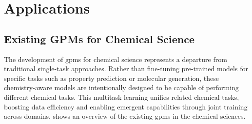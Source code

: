 \section{Applications}



\subsection{Existing GPMs for Chemical Science}

The development of \glspl{gpm} for chemical science represents a departure from traditional single-task approaches. Rather than fine-tuning pre-trained models for specific tasks such as property prediction or molecular generation, these chemistry-aware models are intentionally designed to be capable of performing different chemical tasks. This multitask learning unifies related chemical tasks, boosting data efficiency and enabling emergent capabilities through joint training across domains.  shows an overview of the existing \glspl{gpm} in the chemical sciences.

